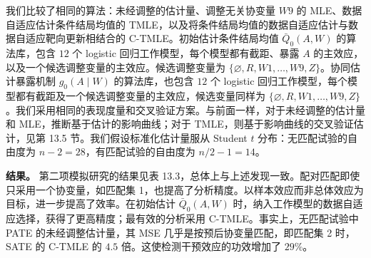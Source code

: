 我们比较了相同的算法：未经调整的估计量、调整无关协变量 $W9$ 的 MLE、数据自适应估计条件结局均值的 TMLE，以及将条件结局均值的数据自适应估计与数据自适应靶向更新相结合的 C-TMLE。初始估计条件结局均值 $\bar Q_0(A,W)$ 的算法库，包含 $12$ 个 logistic 回归工作模型，每个模型都有截距、暴露 $A$ 的主效应，以及一个候选调整变量的主效应。候选调整变量为 $\{\varnothing,R,W1,\ldots,W9,Z\}$。协同估计暴露机制 $g_0(A\mid W)$ 的算法库，也包含 $12$ 个 logistic 回归工作模型，每个模型都有截距及一个候选调整变量的主效应，候选变量同样为 $\{\varnothing,R,W1,\ldots,W9,Z\}$。我们采用相同的表现度量和交叉验证方案。与前面一样，对于未经调整的估计量和 MLE，推断基于估计的影响曲线；对于 TMLE，则基于影响曲线的交叉验证估计，见第 13.5 节。我们假设标准化估计量服从 Student $t$ 分布：无匹配试验的自由度为 $n-2=28$，有匹配试验的自由度为 $n/2-1=14$。

\noindent\textbf{结果。}
第二项模拟研究的结果见表 13.3，总体上与上述发现一致。配对匹配即使只采用一个协变量，如匹配集 1，也提高了分析精度。以样本效应而非总体效应为目标，进一步提高了效率。在初始估计 $\bar Q_0(A,W)$ 时，纳入工作模型的数据自适应选择，获得了更高精度；最有效的分析采用 C-TMLE。事实上，无匹配试验中 PATE 的未经调整估计量，其 MSE 几乎是按预后协变量匹配，即匹配集 2 时，SATE 的 C-TMLE 的 $4.5$ 倍。这使检测干预效应的功效增加了 $29\%$。

